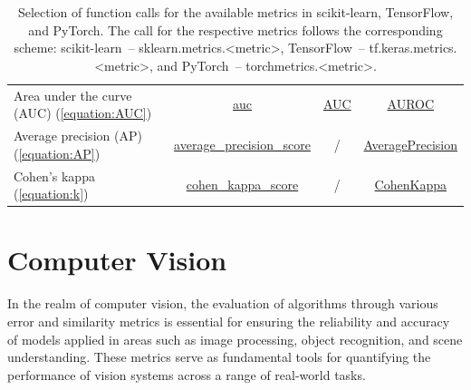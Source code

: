 \documentclass{article}
\begin{document}
\begin{table}[H]
{\begin{tabular}{|l|c|c|c|}
        Area under the curve (AUC) (\ref{equation:AUC})
        &
        \href{https://scikit-learn.org/stable/modules/generated/sklearn.metrics.auc.html\#sklearn.metrics.auc}{auc}
        &
        \href{https://www.tensorflow.org/api_docs/python/tf/keras/metrics/AUC}{AUC}
        &
        \href{https://torchmetrics.readthedocs.io/en/latest/classification/auroc.html}{AUROC}
        \\

        Average precision (AP) (\ref{equation:AP})
        &
        \href{https://scikit-learn.org/stable/modules/generated/sklearn.metrics.average_precision_score.html\#sklearn.metrics.average_precision_score}{average\_precision\_score}
        &
        /
        &
        \href{https://torchmetrics.readthedocs.io/en/latest/classification/average_precision.html}{AveragePrecision}
        \\

        Cohen's kappa (\ref{equation:k})
        &
        \href{https://scikit-learn.org/stable/modules/generated/sklearn.metrics.cohen_kappa_score.html\#sklearn.metrics.cohen_kappa_score}{cohen\_kappa\_score}
        &
        /
        &
        \href{https://torchmetrics.readthedocs.io/en/latest/classification/cohen_kappa.html}{CohenKappa}
        \\

        \hline
    \end{tabular}}

    \caption{Selection of function calls for the available metrics in scikit-learn, TensorFlow, and PyTorch. The call for the respective metrics follows the corresponding scheme: scikit-learn~-- sklearn.metrics.<metric>, TensorFlow~-- tf.keras.metrics.<metric>, and PyTorch~-- torchmetrics.<metric>.}
    \label{table:ML_functions}
\end{table}




\clearpage




\section{Computer Vision}

In the realm of computer vision, the evaluation of algorithms through various error and similarity metrics is essential for ensuring the reliability and accuracy of models applied in areas such as image processing, object recognition, and scene understanding. These metrics serve as fundamental tools for quantifying the performance of vision systems across a range of real-world tasks.
\end{document}
